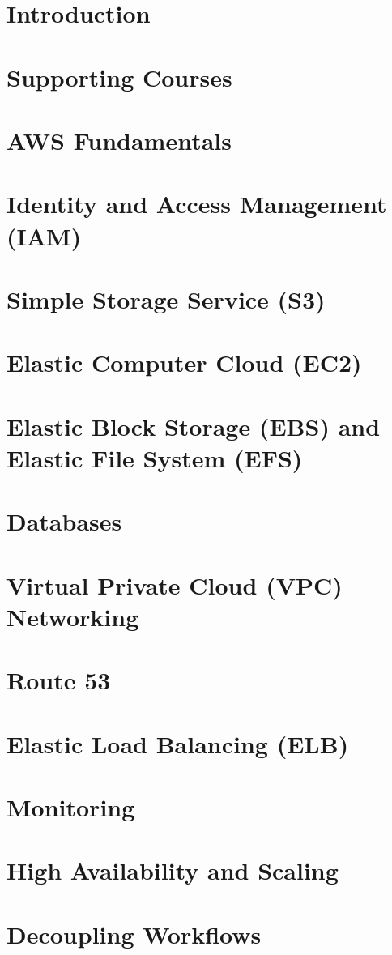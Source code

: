 \documentclass{article} %
\begin{document}
\section{Introduction}
\section{Supporting Courses}
\section{AWS Fundamentals}
\section{Identity and Access Management (IAM)}
\section{Simple Storage Service (S3)}
\section{Elastic Computer Cloud (EC2)}
\section{Elastic Block Storage (EBS) and Elastic File System (EFS)}
\section{Databases}
\section{Virtual Private Cloud (VPC) Networking}
\section{Route 53}
\section{Elastic Load Balancing (ELB)}
\section{Monitoring}
\section{High Availability and Scaling}
\section{Decoupling Workflows}
\end{document}
